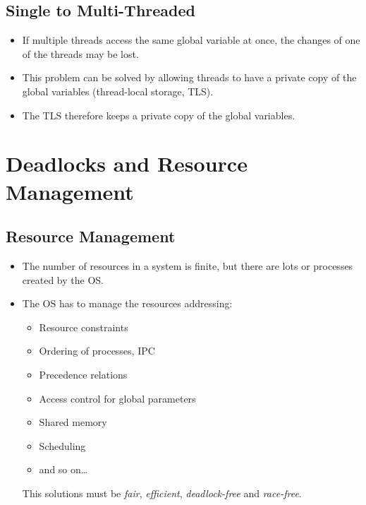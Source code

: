 \documentclass[a4paper, 11pt, accentcolor = tud3b]{tudreport}
\begin{document}
        \section{Single to Multi-Threaded}
            \begin{itemize}
            	\item If multiple threads access the same global variable at once, the changes of one of the threads may be lost.
            	\item This problem can be solved by allowing threads to have a private copy of the global variables (thread-local storage, TLS).
            	\item The TLS therefore keeps a private copy of the global variables.
            \end{itemize}

    \chapter{Deadlocks and Resource Management}
	    \label{c:deadlocks}

        \section{Resource Management}
            \begin{itemize}
            	\item The number of resources in a system is finite, but there are lots or processes created by the OS.
            	\item The OS has to manage the resources addressing:
	            	\begin{itemize}
	            		\item Resource constraints
	            		\item Ordering of processes, IPC
	            		\item Precedence relations
	            		\item Access control for global parameters
	            		\item Shared memory
	            		\item Scheduling
	            		\item and so on\dots
	            	\end{itemize}
	            	This solutions must be \textit{fair}, \textit{efficient}, \textit{deadlock-free} and \textit{race-free}.
            \end{itemize}
\end{document}
